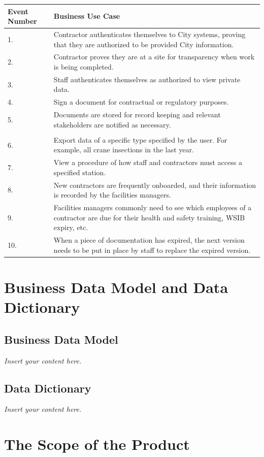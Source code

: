 \documentclass[12pt]{article}
\newcommand{\lips}{\textit{Insert your content here.}}
\begin{document}
\begin{tabular}{|l|l|}
\hline
\textbf{Event Number} & \textbf{Business Use Case} \\
\hline
1. & Contractor authenticates themselves to City systems, proving that they are authorized to be provided City information.\\
\hline
2. & Contractor proves they are at a site for transparency when work is being completed.\\
\hline
3. & Staff authenticates themselves as authorized to view private data.\\
\hline
4. & Sign a document for contractual or regulatory purposes.\\
\hline
5. & Documents are stored for record keeping and relevant stakeholders 
are notified as necessary.\\
\\
\hline
6. & Export data of a specific type specified by the user. For example, all crane insections in the last year.\\
\hline
7. & View a procedure of how staff and contractors must access a specified station.\\
\hline
8. & New contractors are frequently onboarded, and their information is recorded by the facilities managers.\\
\hline
9. & Facilities managers commonly need to see which employees of a contractor are due for their health and safety training, WSIB expiry, etc.\\
\hline
10.& When a piece of documentation has expired, the next version needs to be put in place by staff to replace the expired version.\\
\hline
\end{tabular}
\section{Business Data Model and Data Dictionary}
\subsection{Business Data Model}
\lips
\subsection{Data Dictionary}
\lips

\section{The Scope of the Product}
\end{document}
